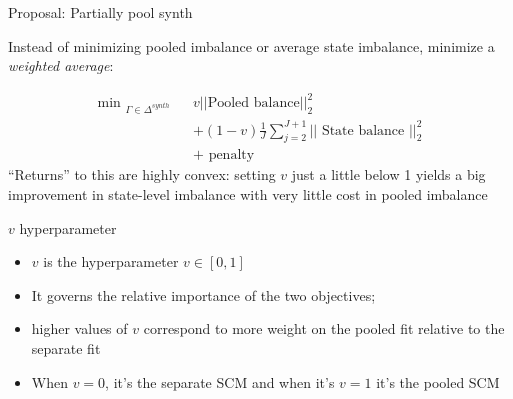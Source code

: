 \documentclass{beamer}
\begin{document}












\begin{frame}{Proposal: Partially pool synth}

Instead of minimizing pooled imbalance or average state imbalance, minimize a \emph{weighted average}:

\begin{eqnarray*}
\textrm{min  }_{\Gamma \in \Delta^{synth}}  &&v|| \textrm{Pooled balance} ||^2_2 \\
&&+ (1-v) \frac{1}{J} \sum_{j=2}^{J+1} ||\textrm{ State balance } ||^2_2 \\
&&+ \textrm{ penalty }
\end{eqnarray*}``Returns'' to this are highly convex: setting $v$ just a little below 1 yields a big improvement in state-level imbalance with very little cost in pooled imbalance

\end{frame}

\begin{frame}{$v$ hyperparameter}

\begin{itemize}

\item $v$ is the hyperparameter $v \in [0,1]$
\item It governs the relative importance of the two objectives; 
\item higher values of $v$ correspond to more weight on the pooled fit relative to the separate fit
\item When $v=0$, it's the separate SCM and when it's $v=1$ it's the pooled SCM
\end{itemize}

\end{frame}
\end{document}
